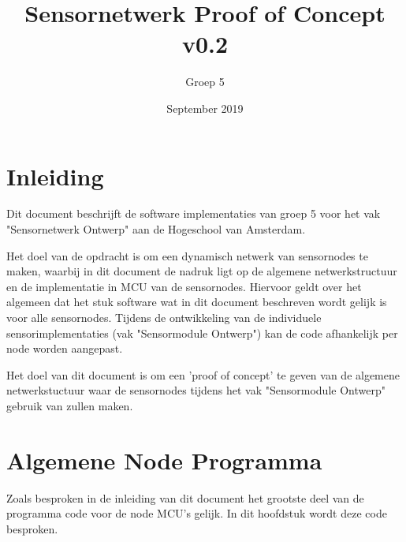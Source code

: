 \documentclass[a4paper, 11pt]{article}
\title{Sensornetwerk Proof of Concept v0.2}
\author{Groep 5}
\date{September 2019}
\begin{document}
\maketitle
\clearpage
{}
\clearpage

\section{Inleiding}
Dit document beschrijft de software implementaties van groep 5 voor het vak "Sensornetwerk Ontwerp" aan de Hogeschool van Amsterdam.

Het doel van de opdracht is om een dynamisch netwerk van sensornodes te maken, waarbij in dit document de nadruk ligt op de algemene netwerkstructuur en de implementatie in MCU van de sensornodes. Hiervoor geldt over het algemeen dat het stuk software wat in dit document beschreven wordt gelijk is voor alle sensornodes. Tijdens de ontwikkeling van de individuele sensorimplementaties (vak "Sensormodule Ontwerp") kan de code afhankelijk per node worden aangepast.

Het doel van dit document is om een 'proof of concept' te geven van de algemene netwerkstuctuur waar de sensornodes tijdens het vak "Sensormodule Ontwerp" gebruik van zullen maken.

\section{Algemene Node Programma}
Zoals besproken in de inleiding van dit document het grootste deel van de programma code voor de node MCU's gelijk. In dit hoofdstuk wordt deze code besproken.
\end{document}
